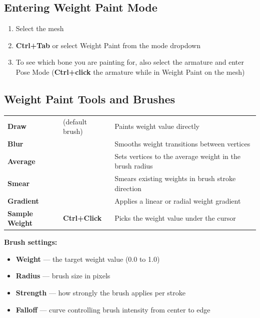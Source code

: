 \subsection{Entering Weight Paint Mode}

\begin{enumerate}[leftmargin=2em]
  \item Select the mesh
  \item \textbf{Ctrl+Tab} or select Weight Paint from the mode dropdown
  \item To see which bone you are painting for, also select the armature and enter Pose Mode (\textbf{Ctrl+click} the armature while in Weight Paint on the mesh)
\end{enumerate}

\subsection{Weight Paint Tools and Brushes}

\begin{center}
\begin{tabularx}{\textwidth}{L{2.5cm}C{2.5cm}X}
\toprule
{}
 &  &  \\
\midrule
\textbf{Draw} & (default brush) & Paints weight value directly \\
\textbf{Blur} & & Smooths weight transitions between vertices \\
\textbf{Average} & & Sets vertices to the average weight in the brush radius \\
\textbf{Smear} & & Smears existing weights in brush stroke direction \\
\textbf{Gradient} & & Applies a linear or radial weight gradient \\
\textbf{Sample Weight} & \textbf{Ctrl+Click} & Picks the weight value under the cursor \\
\bottomrule
\end{tabularx}
\end{center}

\textbf{Brush settings:}

\begin{itemize}[leftmargin=2em]
  \item \textbf{Weight} --- the target weight value (0.0 to 1.0)
  \item \textbf{Radius} --- brush size in pixels
  \item \textbf{Strength} --- how strongly the brush applies per stroke
  \item \textbf{Falloff} --- curve controlling brush intensity from center to edge
\end{itemize}

